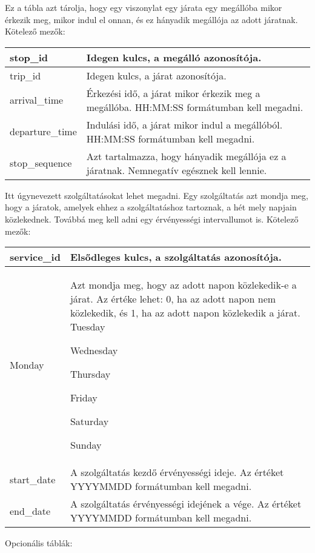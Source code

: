
Ez a tábla azt tárolja, hogy egy viszonylat egy járata egy megállóba mikor érkezik meg, mikor indul el onnan, és ez hányadik megállója az adott járatnak.
Kötelező mezők:

\begin{tabular}{|p{3cm}|p{10cm}|}
\hline
stop\_id & Idegen kulcs, a megálló azonosítója. \\
\hline
trip\_id & Idegen kulcs, a járat azonosítója. \\
\hline
arrival\_time & Érkezési idő, a járat mikor érkezik meg a megállóba. HH:MM:SS formátumban kell megadni. \\
\hline
departure\_time & Indulási idő, a járat mikor indul a megállóból. HH:MM:SS formátumban kell megadni. \\
\hline
stop\_sequence & Azt tartalmazza, hogy hányadik megállója ez a járatnak. Nemnegatív egésznek kell lennie. \\
\hline
\end{tabular}


Itt úgynevezett szolgáltatásokat lehet megadni. Egy szolgáltatás azt mondja meg, hogy a járatok, amelyek ehhez a szolgáltatáshoz tartoznak, a hét mely napjain közlekednek. Továbbá meg kell adni egy érvényességi intervallumot is.
Kötelező mezők:

\begin{tabular}{|p{3cm}|p{10cm}|}
\hline
service\_id & Elsődleges kulcs, a szolgáltatás azonosítója. \\
\hline
Monday & Azt mondja meg, hogy az adott napon közlekedik-e a járat.
Az értéke lehet:
0, ha az adott napon nem közlekedik, és
1, ha az adott napon közlekedik a járat.
Tuesday

Wednesday

Thursday

Friday

Saturday

Sunday\\
\hline
start\_date & A szolgáltatás kezdő érvényességi ideje. Az értéket YYYYMMDD formátumban kell megadni. \\
\hline
end\_date & A szolgáltatás érvényességi idejének a vége. Az értéket YYYYMMDD formátumban kell megadni. \\
\hline
\end{tabular}

Opcionális táblák:


